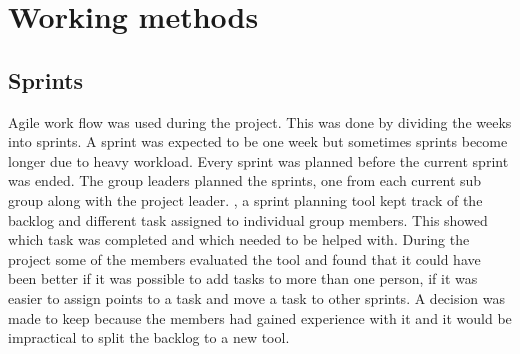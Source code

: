 \chapter{Working methods}
\section{Sprints} 
Agile work flow was used during the project. This was done by dividing the weeks into sprints. A sprint was expected to be one week but sometimes sprints become longer due to heavy workload. Every sprint was planned before the current sprint was ended. The group leaders planned the sprints, one from each current sub group along with the project leader. \taiga{}, a sprint planning tool kept track of the backlog and different task assigned to individual group members. This showed which task was completed and which needed to be helped with. During the project some of the members evaluated the tool \taiga{} and found that it could have been better if it was possible to add tasks to more than one person, if it was easier to assign points to a task and move a task to other sprints. A decision was made to keep \taiga{} because the members had gained experience with it and it would be impractical to split the backlog to a new tool.

